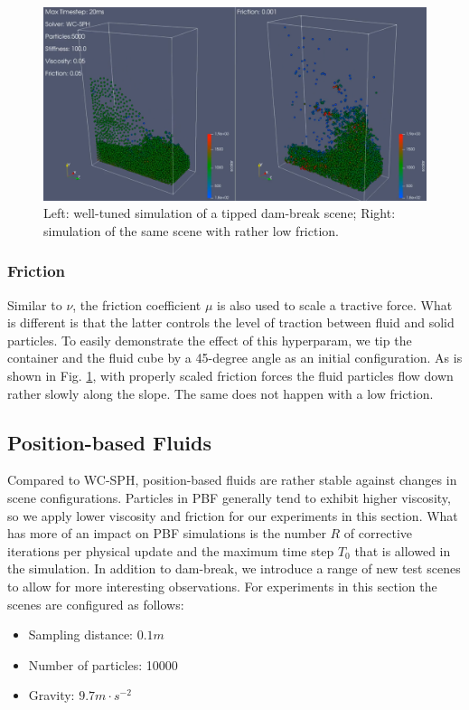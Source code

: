 \documentclass[
	11pt, 
	DIV10,
	ngerman,
	a4paper, 
	oneside, 
	headings=normal, 
	captions=tableheading,
	final, 
	numbers=noenddot
]{scrartcl}
\begin{document}
\begin{figure}[h]
    \centering
    \includegraphics[width=.6\textwidth]{pics/wcsph_friction.png}
    \caption{Left: well-tuned simulation of a tipped dam-break scene; Right: simulation of the same scene with rather low friction.}
    \label{fig:frict}
\end{figure}

\subsubsection{Friction}

Similar to $ \nu $, the friction coefficient $ \mu $ is also used to scale a tractive force. What is different is that the latter controls the level of traction between fluid and solid particles. To easily demonstrate the effect of this hyperparam, we tip the container and the fluid cube by a 45-degree angle as an initial configuration. As is shown in Fig. \ref{fig:frict}, with properly scaled friction forces the fluid particles flow down rather slowly along the slope. The same does not happen with a low friction.

\subsection{Position-based Fluids}

Compared to WC-SPH, position-based fluids are rather stable against changes in scene configurations. Particles in PBF generally tend to exhibit higher viscosity, so we apply lower viscosity and friction for our experiments in this section. What has more of an impact on PBF simulations is the number $ R $ of corrective iterations per physical update and the maximum time step $ T_{0} $ that is allowed in the simulation. In addition to dam-break, we introduce a range of new test scenes to allow for more interesting observations. For experiments in this section the scenes are configured as follows:

\begin{itemize}
    \item Sampling distance: $ 0.1m $
    \item Number of particles: 10000
    \item Gravity: $ 9.7m \cdot s^{-2} $
\end{itemize}
\end{document}
